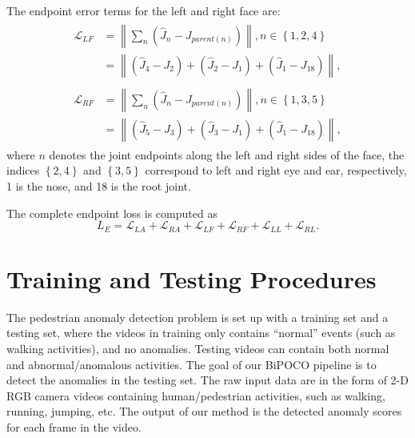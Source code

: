 \documentclass[nohyperref]{article}
\theoremstyle{plain}
\theoremstyle{definition}
\theoremstyle{remark}
\begin{document}
The endpoint error terms for the left and right face are:
\begin{align}
\label{eqn:leftface}
\begin{split}
\mathcal{L}_{LF} &= \left \| \sum_n (\hat{J}_n - J_{parent(n)})\right \|,  n\in \left \{ 1,2,4\right \}
\\
&=  \left \| \left (\hat{J}_{4} - {J}_{2} \right ) + \left (\hat{J}_{2} - {J}_{1} \right ) + \left (\hat{J}_{1} - {J}_{18} \right ) \right \| ,
\end{split}
\end{align}
\begin{align}
\label{eqn:rightface}
\begin{split}
\mathcal{L}_{RF} &= \left \| \sum_n (\hat{J}_n - J_{parent(n)})\right \|,  n\in \left \{ 1,3,5\right \}
\\
&=  \left \| \left (\hat{J}_{5} - {J}_{3} \right ) + \left (\hat{J}_{3} - {J}_{1} \right ) + \left (\hat{J}_{1} - {J}_{18} \right ) \right \| ,
\end{split}
\end{align}
where $n$ denotes the joint endpoints along the left and right sides of the face, the indices  $\left \{ 2, 4\right \}$ and $\left \{ 3, 5\right \}$ correspond to left and right eye and ear, respectively, 1 is the nose, and 18 is the root joint. 

The complete endpoint loss is computed as 
\begin{equation}
\label{eqn:completeendpointloss}
L_{E} = \mathcal{L}_{LA} + \mathcal{L}_{RA} + \mathcal{L}_{LF} + \mathcal{L}_{RF} + \mathcal{L}_{LL} + \mathcal{L}_{RL}.
\end{equation}






\section{Training and Testing Procedures}
The pedestrian anomaly detection problem is set up with a training set and a testing set, where the videos in training only contains ``normal'' events (such as walking activities), and no anomalies. Testing videos can contain both normal and abnormal/anomalous activities. The goal of our BiPOCO pipeline is to detect the anomalies in the testing set. The raw input data are in the form of 2-D RGB camera videos containing human/pedestrian activities, such as walking, running, jumping, etc. The output of our method is the detected anomaly scores for each frame in the video. 
\end{document}
